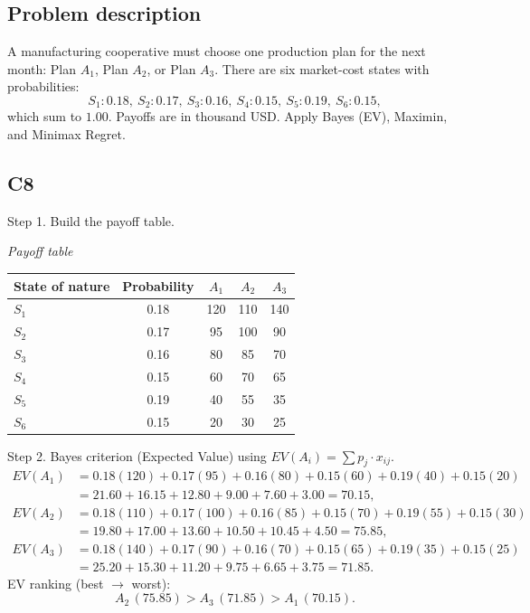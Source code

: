 	\begin{ExamProblems}
		\item
		\subsection*{Problem description}
		A manufacturing cooperative must choose one production plan for the next month: Plan $A_1$, Plan $A_2$, or Plan $A_3$.
		There are six market-cost states with probabilities:
		\[
		S_1:0.18,\ S_2:0.17,\ S_3:0.16,\ S_4:0.15,\ S_5:0.19,\ S_6:0.15,
		\]
		which sum to $1.00$.
		Payoffs are in thousand USD. Apply Bayes (EV), Maximin, and Minimax Regret.

		\subsection*{C8}
		Step 1. Build the payoff table.
		\begin{center}
			\textit{Payoff table} \\
			\begin{tabular}{l c c c c}
				\toprule
				State of nature & Probability & $A_1$ & $A_2$ & $A_3$ \\
				\midrule
				$S_1$ & 0.18 & 120 & 110 & 140 \\
				$S_2$ & 0.17 & 95 & 100 & 90 \\
				$S_3$ & 0.16 & 80 & 85 & 70 \\
				$S_4$ & 0.15 & 60 & 70 & 65 \\
				$S_5$ & 0.19 & 40 & 55 & 35 \\
				$S_6$ & 0.15 & 20 & 30 & 25 \\
				\bottomrule
			\end{tabular}
		\end{center}

		Step 2. Bayes criterion (Expected Value) using $EV(A_i)=\sum p_j\cdot x_{ij}$.
		\[
		\begin{aligned}
		EV(A_1) &= 0.18(120)+0.17(95)+0.16(80)+0.15(60)+0.19(40)+0.15(20)\\
		&=21.60+16.15+12.80+9.00+7.60+3.00=70.15,\\
		EV(A_2) &= 0.18(110)+0.17(100)+0.16(85)+0.15(70)+0.19(55)+0.15(30)\\
		&=19.80+17.00+13.60+10.50+10.45+4.50=75.85,\\
		EV(A_3) &= 0.18(140)+0.17(90)+0.16(70)+0.15(65)+0.19(35)+0.15(25)\\
		&=25.20+15.30+11.20+9.75+6.65+3.75=71.85.
		\end{aligned}
		\]
		EV ranking (best $\to$ worst):
		\[
		A_2\,(75.85) > A_3\,(71.85) > A_1\,(70.15).
		\]


\end{ExamProblems}
